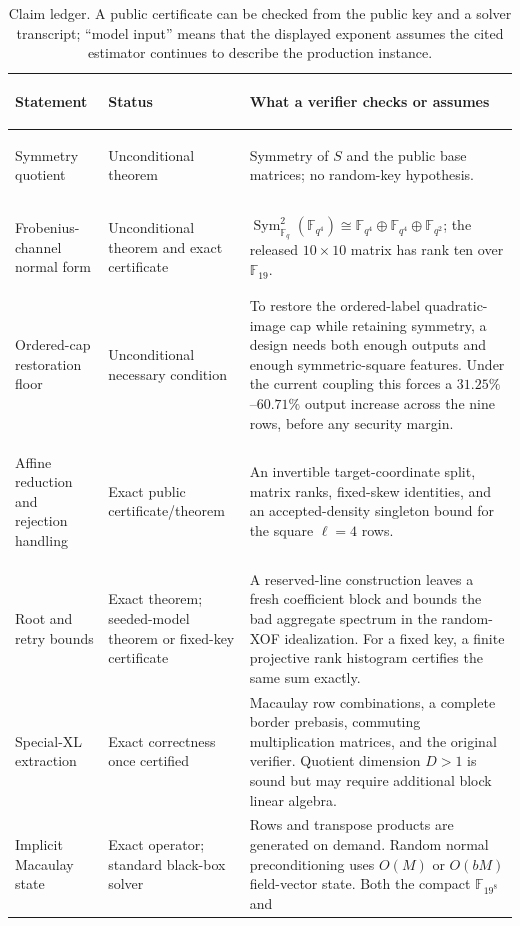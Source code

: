 \documentclass[11pt]{article}
\newcommand{\F}{\mathbb F}
\newcommand{\Sym}{\operatorname{Sym}}
\begin{document}
\begin{table}[tbp]
\centering
\caption{Claim ledger.  A public certificate can be checked from the public key
and a solver transcript; ``model input'' means that the displayed exponent
assumes the cited estimator continues to describe the production instance.}
\label{tab:claim-ledger}
\small
\renewcommand{\arraystretch}{1.08}
\begin{tabularx}{0.97\textwidth}{@{}>{\bfseries\raggedright\arraybackslash}p{}>{\raggedright\arraybackslash}p{}X@{}}
\toprule
Statement & Status & What a verifier checks or assumes\\
\midrule
Symmetry quotient & Unconditional theorem & Symmetry of $S$ and the public
base matrices; no random-key hypothesis.\\
Frobenius-channel normal form & Unconditional theorem and exact certificate &
$\Sym^2_{\F_q}(\F_{q^4})\cong\F_{q^4}\oplus\F_{q^4}\oplus\F_{q^2}$;
the released $10\times10$ matrix has rank ten over $\F_{19}$.\\
Ordered-cap restoration floor & Unconditional necessary condition & To
restore the ordered-label quadratic-image cap while retaining symmetry, a
design needs both enough outputs and enough symmetric-square features.  Under
the current coupling this forces a $31.25\%$--$60.71\%$ output increase across
the nine rows, before any security margin.\\
Affine reduction and rejection handling & Exact public certificate/theorem &
An invertible target-coordinate split, matrix ranks, fixed-skew identities,
and an accepted-density singleton bound for the square $\ell=4$ rows.\\
Root and retry bounds & Exact theorem; seeded-model theorem or fixed-key
certificate & A reserved-line construction leaves a fresh coefficient block
and bounds the bad aggregate spectrum in the random-XOF idealization.  For
a fixed key, a finite projective rank histogram certifies the same sum exactly.\\
Special-XL extraction & Exact correctness once certified & Macaulay row
combinations, a complete border prebasis, commuting multiplication matrices,
and the original verifier.  Quotient dimension $D>1$ is sound but may require
additional block linear algebra.\\
Implicit Macaulay state & Exact operator; standard black-box solver & Rows and
transpose products are generated on demand.  Random normal preconditioning
uses $O(M)$ or $O(bM)$ field-vector state.  Both the compact $\F_{19^8}$ and

\end{tabularx}
\end{table}
\end{document}
